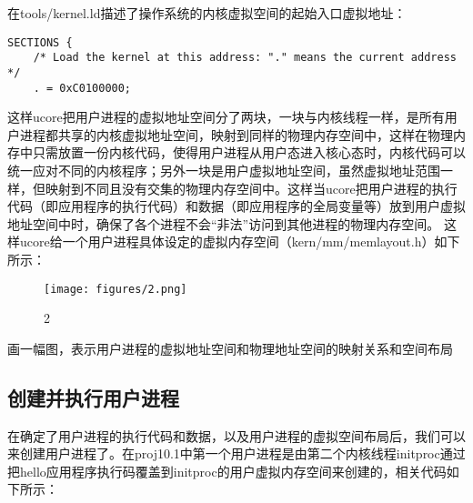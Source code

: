 在tools/kernel.ld描述了操作系统的内核虚拟空间的起始入口虚拟地址：

\begin{lstlisting}
SECTIONS {
    /* Load the kernel at this address: "." means the current address */
    . = 0xC0100000;
\end{lstlisting}

这样ucore把用户进程的虚拟地址空间分了两块，一块与内核线程一样，是所有用户进程都共享的内核虚拟地址空间，映射到同样的物理内存空间中，这样在物理内存中只需放置一份内核代码，使得用户进程从用户态进入核心态时，内核代码可以统一应对不同的内核程序；另外一块是用户虚拟地址空间，虽然虚拟地址范围一样，但映射到不同且没有交集的物理内存空间中。这样当ucore把用户进程的执行代码（即应用程序的执行代码）和数据（即应用程序的全局变量等）放到用户虚拟地址空间中时，确保了各个进程不会``非法''访问到其他进程的物理内存空间。
这样ucore给一个用户进程具体设定的虚拟内存空间（kern/mm/memlayout.h）如下所示：

\begin{figure}[htbp]
\centering
\texttt{[image: figures/2.png]}
\caption{2}
\end{figure}

画一幅图，表示用户进程的虚拟地址空间和物理地址空间的映射关系和空间布局

\subsection{创建并执行用户进程}\label{ux521bux5efaux5e76ux6267ux884cux7528ux6237ux8fdbux7a0b}

在确定了用户进程的执行代码和数据，以及用户进程的虚拟空间布局后，我们可以来创建用户进程了。在proj10.1中第一个用户进程是由第二个内核线程initproc通过把hello应用程序执行码覆盖到initproc的用户虚拟内存空间来创建的，相关代码如下所示：

